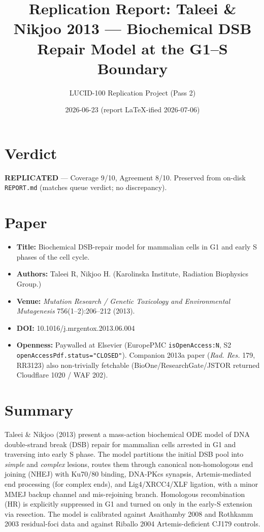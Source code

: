 \documentclass[11pt]{article}
\title{Replication Report: Taleei \& Nikjoo 2013 --- Biochemical DSB Repair Model at the G1--S Boundary}
\author{LUCID-100 Replication Project (Pass 2)}
\date{2026-06-23 (report LaTeX-ified 2026-07-06)}
\begin{document}
\maketitle

\section*{Verdict}
\textbf{REPLICATED} --- Coverage 9/10, Agreement 8/10. Preserved from on-disk \texttt{REPORT.md} (matches queue verdict; no discrepancy).

\section{Paper}
\begin{itemize}
  \item \textbf{Title:} Biochemical DSB-repair model for mammalian cells in G1 and early S phases of the cell cycle.
  \item \textbf{Authors:} Taleei R, Nikjoo H. (Karolinska Institute, Radiation Biophysics Group.)
  \item \textbf{Venue:} \textit{Mutation Research / Genetic Toxicology and Environmental Mutagenesis} 756(1--2):206--212 (2013).
  \item \textbf{DOI:} 10.1016/j.mrgentox.2013.06.004
  \item \textbf{Openness:} Paywalled at Elsevier (EuropePMC \texttt{isOpenAccess:N}, S2 \texttt{openAccessPdf.status="CLOSED"}). Companion 2013a paper (\textit{Rad. Res.} 179, RR3123) also non-trivially fetchable (BioOne/ResearchGate/JSTOR returned Cloudflare 1020 / WAF 202).
\end{itemize}

\section{Summary}
Taleei \& Nikjoo (2013) present a mass-action biochemical ODE model of DNA double-strand break (DSB) repair for mammalian cells arrested in G1 and traversing into early S phase. The model partitions the initial DSB pool into \emph{simple} and \emph{complex} lesions, routes them through canonical non-homologous end joining (NHEJ) with Ku70/80 binding, DNA-PKcs synapsis, Artemis-mediated end processing (for complex ends), and Lig4/XRCC4/XLF ligation, with a minor MMEJ backup channel and mis-rejoining branch. Homologous recombination (HR) is explicitly suppressed in G1 and turned on only in the early-S extension via resection. The model is calibrated against Asaithamby 2008 and Rothkamm 2003 residual-foci data and against Riballo 2004 Artemis-deficient CJ179 controls.
\end{document}
